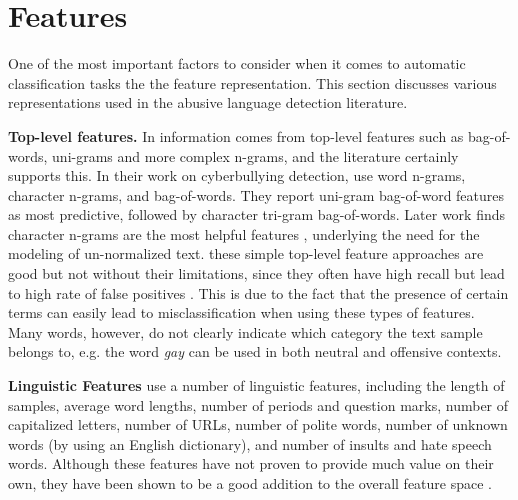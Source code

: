 \documentclass{article}
\begin{document}
\section{Features}

One of the most important factors to consider when it comes to automatic classification tasks the the feature representation.
This section discusses various representations used in the abusive language detection literature.  

\textbf{Top-level features.} In \cite{schmidt2017survey} information comes from top-level features such as bag-of-words, uni-grams and more complex n-grams, and the literature certainly supports this. In their work on cyberbullying detection, \cite{van2015detection} use word n-grams, character n-grams, and bag-of-words.  They report uni-gram bag-of-word features as  most predictive, followed by character tri-gram bag-of-words. Later work finds character n-grams are the most helpful features \cite{nobata2016abusive}, underlying the need for the modeling of un-normalized text. these simple top-level feature approaches are good but not without their limitations, since they often have high recall but lead to high rate of false positives \cite{davidson2017automated}. This is due to the fact that the presence of certain terms can easily lead to misclassification when using these types of features. 
Many words, however, do not clearly indicate which category the text sample belongs to, e.g. the word \textit{gay} can be used in both neutral and offensive contexts.

\textbf{Linguistic Features}
\cite{nobata2016abusive} use a number of linguistic features, including the length of samples, average word lengths, number of periods and question marks, number of capitalized letters, number of URLs, number of polite words, number of unknown words (by using an English dictionary), and number of insults and hate speech words. Although these features have not proven to provide much value on their own, they have been shown to be a good addition to the overall feature space \cite{nobata2016abusive}.
\end{document}
